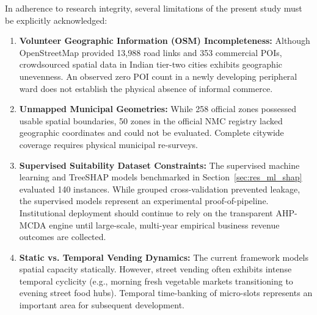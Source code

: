 In adherence to research integrity, several limitations of the present study must be explicitly acknowledged:
\begin{enumerate}
    \item \textbf{Volunteer Geographic Information (OSM) Incompleteness:} Although OpenStreetMap provided 13,988 road links and 353 commercial POIs, crowdsourced spatial data in Indian tier-two cities exhibits geographic unevenness. An observed zero POI count in a newly developing peripheral ward does not establish the physical absence of informal commerce.
    \item \textbf{Unmapped Municipal Geometries:} While 258 official zones possessed usable spatial boundaries, 50 zones in the official NMC registry lacked geographic coordinates and could not be evaluated. Complete citywide coverage requires physical municipal re-surveys.
    \item \textbf{Supervised Suitability Dataset Constraints:} The supervised machine learning and TreeSHAP models benchmarked in Section~\ref{sec:res_ml_shap} evaluated 140 instances. While grouped cross-validation prevented leakage, the supervised models represent an experimental proof-of-pipeline. Institutional deployment should continue to rely on the transparent AHP-MCDA engine until large-scale, multi-year empirical business revenue outcomes are collected.
    \item \textbf{Static vs. Temporal Vending Dynamics:} The current framework models spatial capacity statically. However, street vending often exhibits intense temporal cyclicity (e.g., morning fresh vegetable markets transitioning to evening street food hubs). Temporal time-banking of micro-slots represents an important area for subsequent development.
\end{enumerate}
